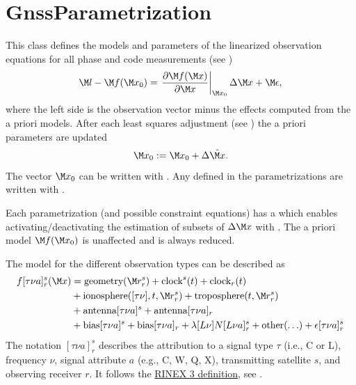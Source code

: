 \section{GnssParametrization}\label{gnssParametrizationType}
This class defines the models and parameters of the linearized observation equations
for all phase and code measurements (see )
\begin{equation}\label{gnssParametrizationType:model}
  \M l - \M f(\M x_0) = \left.\frac{\partial \M f(\M x)}{\partial \M x}\right|_{\M x_0} \Delta\M x + \M\epsilon,
\end{equation}
where the left side is the observation vector minus the effects computed from the a priori models.
After each least squares adjustment
(see )
the a priori parameters are updated
\begin{equation}\label{gnssParametrizationType:update}
  \M x_0 := \M x_0 + \Delta\hat{\M x}.
\end{equation}
The vector $\M x_0$ can be written with
.
Any  defined in the parametrizations are written with
.

Each parametrization (and possible constraint equations) has a  which enables
activating/deactivating the estimation of subsets of $\Delta\M x$ with
.
The a priori model $\M f(\M x_0)$ is unaffected and is always reduced.

The model for the different observation types can be described as
\begin{equation}\label{gnssParametrizationType:gnssFullModel}
\begin{split}
  f[\tau\nu a]_r^s(\M x) &= \text{geometry}(\M r_r^s) + \text{clock}^s(t) + \text{clock}_r(t) \\
               &+ \text{ionosphere}([\tau\nu],t,\M r_r^s) + \text{troposphere}(t,\M r_r^s) \\
               &+ \text{antenna}[\tau\nu a]^s  + \text{antenna}[\tau\nu a]_r \\
               &+ \text{bias}[\tau\nu a]^s + \text{bias}[\tau\nu a]_r
               + \lambda[L\nu] N[L\nu a]_r^s + \text{other}(\ldots) + \epsilon[\tau\nu a]_r^s
\end{split}
\end{equation}
The notation $[\tau\nu a]_r^s$ describes the
attribution to a signal type $\tau$ (i.e., C or L), frequency $\nu$,
signal attribute $a$ (e.g., C, W, Q, X), transmitting satellite $s$, and observing receiver $r$.
It follows the \href{https://files.igs.org/pub/data/format/rinex305.pdf}{RINEX 3 definition},
see .

